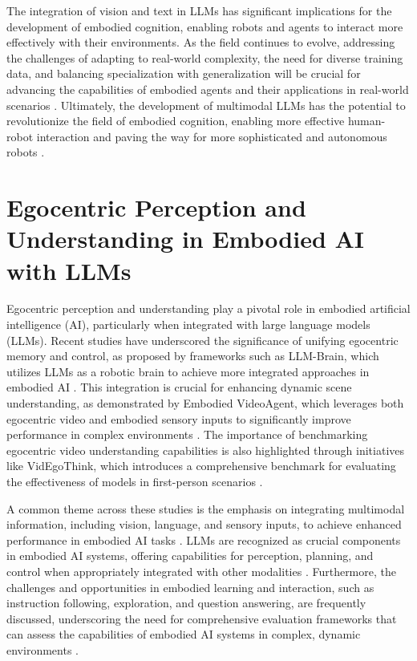 \documentclass[conference]{IEEEtran}
\begin{document}
The integration of vision and text in LLMs has significant implications for the development of embodied cognition, enabling robots and agents to interact more effectively with their environments. As the field continues to evolve, addressing the challenges of adapting to real-world complexity, the need for diverse training data, and balancing specialization with generalization will be crucial for advancing the capabilities of embodied agents and their applications in real-world scenarios \cite{b14}. Ultimately, the development of multimodal LLMs has the potential to revolutionize the field of embodied cognition, enabling more effective human-robot interaction and paving the way for more sophisticated and autonomous robots \cite{b15}.

\section{Egocentric Perception and Understanding in Embodied AI with LLMs}
Egocentric perception and understanding play a pivotal role in embodied artificial intelligence (AI), particularly when integrated with large language models (LLMs). Recent studies have underscored the significance of unifying egocentric memory and control, as proposed by frameworks such as LLM-Brain, which utilizes LLMs as a robotic brain to achieve more integrated approaches in embodied AI \cite{b1}. This integration is crucial for enhancing dynamic scene understanding, as demonstrated by Embodied VideoAgent, which leverages both egocentric video and embodied sensory inputs to significantly improve performance in complex environments \cite{b2}. The importance of benchmarking egocentric video understanding capabilities is also highlighted through initiatives like VidEgoThink, which introduces a comprehensive benchmark for evaluating the effectiveness of models in first-person scenarios \cite{b3}.

A common theme across these studies is the emphasis on integrating multimodal information, including vision, language, and sensory inputs, to achieve enhanced performance in embodied AI tasks \cite{b4}. LLMs are recognized as crucial components in embodied AI systems, offering capabilities for perception, planning, and control when appropriately integrated with other modalities \cite{b5}. Furthermore, the challenges and opportunities in embodied learning and interaction, such as instruction following, exploration, and question answering, are frequently discussed, underscoring the need for comprehensive evaluation frameworks that can assess the capabilities of embodied AI systems in complex, dynamic environments \cite{b6}.
\end{document}
